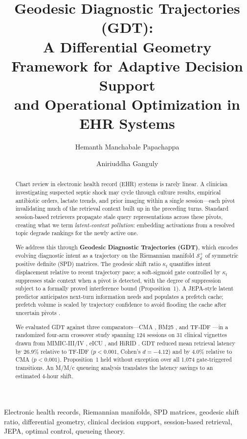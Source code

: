 \documentclass[review]{elsarticle}
\begin{document}
\begin{frontmatter}

\title{Geodesic Diagnostic Trajectories (GDT):\\
A Differential Geometry Framework for Adaptive Decision Support\\
and Operational Optimization in EHR Systems}

\author{Hemanth Manchabale Papachappa}
\author{Aniriuddha Ganguly}

\begin{abstract}
Chart review in electronic health record (EHR) systems is rarely linear.
A clinician investigating suspected septic shock may cycle through culture results,
empirical antibiotic orders, lactate trends, and prior imaging within a single
session---each pivot invalidating much of the retrieval context built up in the
preceding turns. Standard session-based retrievers propagate stale query
representations across these pivots, creating what we term
\emph{latent-context pollution}: embedding activations from a resolved topic
degrade rankings for the newly active one.

We address this through \textbf{Geodesic Diagnostic Trajectories (GDT)}, which
encodes evolving diagnostic intent as a trajectory on the Riemannian manifold
$\mathcal{S}_d^+$ of symmetric positive definite (SPD) matrices. The geodesic
shift ratio $\kappa_t$ quantifies intent displacement relative to recent
trajectory pace; a soft-sigmoid gate controlled by $\kappa_t$ suppresses stale
context when a pivot is detected, with the degree of suppression subject to a
formally proved interference bound (Proposition~1). A JEPA-style latent predictor
\cite{assran2023_ijepa,lecun2022} anticipates next-turn information needs and
populates a prefetch cache; prefetch volume is scaled by trajectory confidence to
avoid flooding the cache after uncertain pivots \cite{sweller1988_cogl}.

We evaluated GDT against three comparators---CMA \cite{cma2026,cma2026_clinical},
BM25 \cite{robertson1995}, and TF-IDF \cite{salton83}---in a randomized four-arm
crossover study spanning 124 sessions on 31 clinical vignettes drawn from
MIMIC-III/IV \cite{johnson2016_mimic3,pollard2018_mimic4}, eICU
\cite{pollard2018_eicu}, and HiRID \cite{muller2021_hirid}. GDT reduced mean
retrieval latency by 26.9\% relative to TF-IDF ($p{<}0.001$, Cohen's
$d{=}{-4.12}$) and by 4.0\% relative to CMA ($p{<}0.001$). Proposition~1 held
without exception over all 1,074 gate-triggered transitions. An M/M/c queueing
analysis \cite{kleinrock1975} translates the latency savings to an estimated
4-hour shift.
\end{abstract}

\begin{keyword}
Electronic health records, Riemannian manifolds, SPD matrices, geodesic shift
ratio, differential geometry, clinical decision support, session-based retrieval,
JEPA, optimal control, queueing theory.
\end{keyword}

\end{frontmatter}
\end{document}
